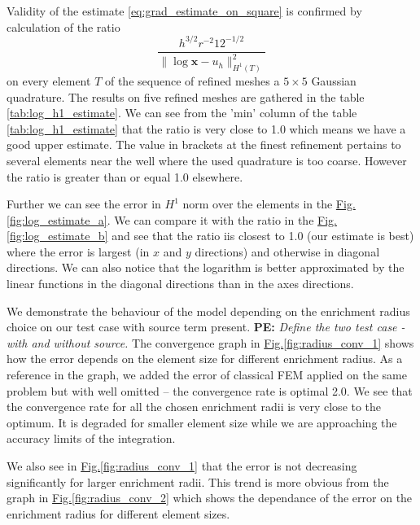 \documentclass[preprint,12pt]{elsarticle}
\newcommand{\fig}[1]{\hyperref[#1]{Fig.\ref{#1}}}
\def\vc#1{\mathbf{\boldsymbol{#1}}}     %
\newcommand{\notePE}[1]{{\color{Orange} \textbf{PE: } \textit{#1}}}
\begin{document}
Validity of the estimate \eqref{eq:grad_estimate_on_square} is confirmed by calculation of the ratio
\begin{equation} \label{eqn:log_h1_estimate_ratio}
\frac{h^{3/2} r^{-2} 12^{-1/2}}{\|\log \vc x - u_h\|^2_{H^1(T)}}
\end{equation}
on every element $T$ of the sequence of refined meshes a $5\times5$ Gaussian quadrature. 
The results on five refined meshes are gathered in the table \ref{tab:log_h1_estimate}. 
We can see from the 'min' column of the table \ref{tab:log_h1_estimate} that the ratio is very close to 1.0 
which means we have a good upper estimate. 
The value in brackets at the finest refinement pertains to several elements near the well where the used 
quadrature is too coarse. However the ratio is greater than or equal 1.0 elsewhere.

Further we can see the error in $H^1$ norm over the elements in the \fig{fig:log_estimate_a}. We can 
compare it with the ratio in the \fig{fig:log_estimate_b} and see that the ratio iis closest to 1.0 
(our estimate is best) where the error is largest 
(in $x$ and $y$ directions) and otherwise in diagonal directions. We can also notice that the logarithm is 
better approximated by the linear functions in the diagonal directions than in the axes directions.




We demonstrate the behaviour of the model depending on the enrichment radius choice on our test case with 
source term present. \notePE{Define the two test case - with and without source.}
The convergence graph in \fig{fig:radius_conv_1} shows how the error depends on the element size for different 
enrichment radius. As a reference in the graph, we added the error of classical FEM applied on the same problem 
but with well omitted -- the convergence rate is optimal 2.0. We see that the convergence rate for all the 
chosen enrichment radii is very close to the optimum. It is degraded for smaller element size while we are
approaching the accuracy limits of the integration.

We also see in \fig{fig:radius_conv_1} that the error is not decreasing significantly for larger enrichment 
radii. This trend is more obvious from the graph in \fig{fig:radius_conv_2} which shows the dependance of the
error on the enrichment radius for different element sizes.
\end{document}
